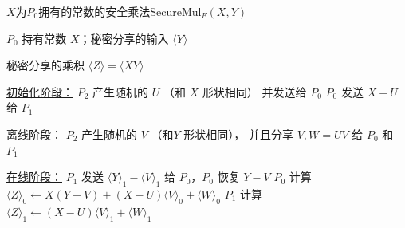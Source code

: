 \begin{algorithm}[h!]
    \caption{$X$为$P_0$拥有的常数的安全乘法\textsf{SecureMul}$_F(X, Y)$}
    \label{alg:perm-llm:secure_mul_fixed}
    \begin{algorithmic}[1]
    \Require $P_0$ 持有常数 $X$；秘密分享的输入 $\langle Y \rangle$
    
    \Ensure 秘密分享的乘积 $\langle Z \rangle = \langle XY \rangle$
    
    \item[\underline{初始化阶段：}]
    \State $P_2$ 产生随机的 $U$ （和 $X$ 形状相同） 并发送给 $P_0$
    \State $P_0$ 发送 $X - U$ 给 $P_1$
    
    \item[\underline{离线阶段：}]
    \State $P_2$ 产生随机的 $V$ （和$Y$ 形状相同）， 并且分享 $V, W = UV$ 给 $P_0$ 和 $P_1$
    
    \item[\underline{在线阶段：}]
    \State $P_1$ 发送 $\langle Y \rangle_1 - \langle V \rangle_1$ 给 $P_0$，$P_0$ 恢复 $Y - V$
    \State $P_0$ 计算 $\langle Z \rangle_0 \gets X(Y-V) + (X-U)\langle V \rangle_0 + \langle W \rangle_0$
    \State $P_1$ 计算 $\langle Z \rangle_1 \gets (X-U) \langle V \rangle_1 + \langle W \rangle_1$
    \end{algorithmic}
\end{algorithm}


